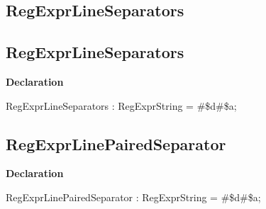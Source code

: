 \documentclass{report}
\newif\ifpdf
\begin{document}
\subsection*{\large{\textbf{RegExprLineSeparators}}\normalsize\hspace{1ex}\hrulefill}
\else
\subsection*{RegExprLineSeparators}
\fi
\label{RegExpr-RegExprLineSeparators}
\begin{list}{}{
\setlength{\itemindent}{0cm}
\setlength{\listparindent}{0cm}
\setlength{\leftmargin}{\evensidemargin}
\addtolength{\leftmargin}{\tmplength}
\settowidth{\labelsep}{X}
\addtolength{\leftmargin}{\labelsep}
\setlength{\labelwidth}{\tmplength}
}
\item[\textbf{Declaration}\hfill]
\ifpdf
\begin{flushleft}
\fi
\begin{ttfamily}
RegExprLineSeparators : RegExprString =   {\#}{\$}d{\#}{\$}a;\end{ttfamily}

\ifpdf
\end{flushleft}
\fi

\end{list}
\ifpdf
\subsection*{\large{\textbf{RegExprLinePairedSeparator}}\normalsize\hspace{1ex}\hrulefill}
\else
\subsection*{RegExprLinePairedSeparator}
\fi
\label{RegExpr-RegExprLinePairedSeparator}
\begin{list}{}{
\setlength{\itemindent}{0cm}
\setlength{\listparindent}{0cm}
\setlength{\leftmargin}{\evensidemargin}
\addtolength{\leftmargin}{\tmplength}
\settowidth{\labelsep}{X}
\addtolength{\leftmargin}{\labelsep}
\setlength{\labelwidth}{\tmplength}
}
\item[\textbf{Declaration}\hfill]
\ifpdf
\begin{flushleft}
\fi
\begin{ttfamily}
RegExprLinePairedSeparator : RegExprString =   {\#}{\$}d{\#}{\$}a;\end{ttfamily}

\ifpdf
\end{flushleft}
\fi

\end{list}
\ifpdf
\end{document}
